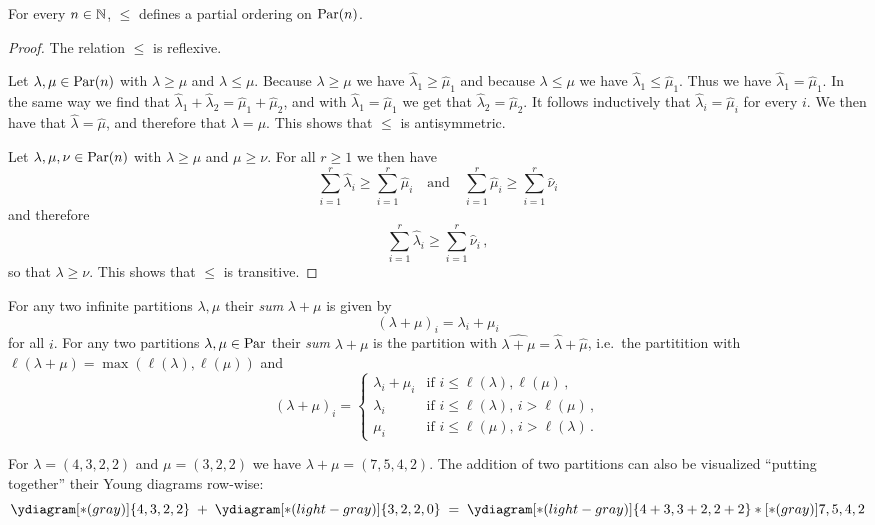 \begin{lemma}
  For every $n \in \mathbb{N}$, $\leq$ defines a partial ordering on $\operatorname{Par}(n)$.
\end{lemma}
\begin{proof}
  The relation $\leq$ is reflexive.
  
  Let $\lambda, \mu \in \operatorname{Par}(n)$ with $\lambda \geq \mu$ and $\lambda \leq \mu$.
  Because $\lambda \geq \mu$ we have $\hat{\lambda}_1 \geq \hat{\mu}_1$ and because $\lambda \leq \mu$ we have $\hat{\lambda}_1 \leq \hat{\mu}_1$.
  Thus we have $\hat{\lambda}_1 = \hat{\mu}_1$.
  In the same way we find that $\hat{\lambda}_1 + \hat{\lambda}_2 = \hat{\mu}_1 + \hat{\mu}_2$, and with $\hat{\lambda}_1 = \hat{\mu}_1$ we get that $\hat{\lambda}_2 = \hat{\mu}_2$.
  It follows inductively that $\hat{\lambda}_i = \hat{\mu}_i$ for every $i$.
  We then have that $\hat{\lambda} = \hat{\mu}$, and therefore that $\lambda = \mu$.
  This shows that $\leq$ is antisymmetric.
  
  Let $\lambda, \mu, \nu \in \operatorname{Par}(n)$ with $\lambda \geq \mu$ and $\mu \geq \nu$.
  For all $r \geq 1$ we then have
  \[
          \sum_{i=1}^r \hat{\lambda}_i
    \geq  \sum_{i=1}^r \hat{\mu}_i
    \quad\text{and}\quad
          \sum_{i=1}^r \hat{\mu}_i
    \geq  \sum_{i=1}^r \hat{\nu}_i
  \]
  and therefore
  \[
          \sum_{i=1}^r \hat{\lambda}_i
    \geq  \sum_{i=1}^r \hat{\nu}_i \,,
  \]
  so that $\lambda \geq \nu$.
  This shows that $\leq$ is transitive.
\end{proof}

\begin{definition}
  For any two infinite partitions $\lambda, \mu$ their \emph{sum} $\lambda + \mu$ is given by
  \[
      (\lambda + \mu)_i
    = \lambda_i + \mu_i
  \]
  for all $i$.
  For any two partitions $\lambda, \mu \in \operatorname{Par}$ their \emph{sum} $\lambda + \mu$ is the partition with $\widehat{\lambda + \mu} = \hat{\lambda} + \hat{\mu}$, i.e.\ the partitition with $\ell(\lambda + \mu) = \max( \ell(\lambda), \ell(\mu) )$ and
  \[
      (\lambda+\mu)_i
    = \begin{cases}
        \lambda_i + \mu_i & \text{if $i \leq \ell(\lambda), \ell(\mu)$}       \,, \\
        \lambda_i         & \text{if $i \leq \ell(\lambda)$, $i > \ell(\mu)$} \,, \\
        \mu_i             & \text{if $i \leq \ell(\mu)$, $i > \ell(\lambda)$} \,.
      \end{cases}
  \]
\end{definition}


\begin{example}
  For $\lambda = (4,3,2,2)$ and $\mu = (3,2,2)$ we have $\lambda + \mu = (7,5,4,2)$.
  The addition of two partitions can also be visualized “putting together” their Young diagrams row-wise:
  \[
                \ydiagram[*(gray)]{4,3,2,2}
          \;+\; \ydiagram[*(light-gray)]{3,2,2,0}
    \;=\; \ydiagram[*(light-gray)]{4+3,3+2,2+2} * [*(gray)]{7,5,4,2}
  \]
\end{example}




